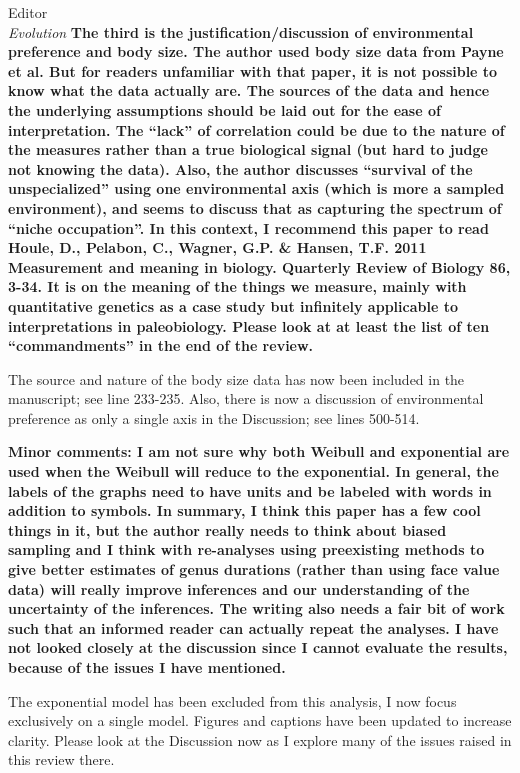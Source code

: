 \documentclass{letter}
\begin{document}
\begin{letter}{Editor \\ \textit{Evolution}}
  \textbf{The third is the justification/discussion of environmental preference and body size. The author used body size data from Payne et al. But for readers unfamiliar with that paper, it is not possible to know what the data actually are. The sources of the data and hence the underlying assumptions should be laid out for the ease of interpretation. The “lack” of correlation could be due to the nature of the measures rather than a true biological signal (but hard to judge not knowing the data). Also, the author discusses “survival of the unspecialized” using one environmental axis (which is more a sampled environment), and seems to discuss that as capturing the spectrum of “niche occupation”. In this context, I recommend this paper to read Houle, D., Pelabon, C., Wagner, G.P. \& Hansen, T.F. 2011 Measurement and meaning in biology. Quarterly Review of Biology 86, 3-34. It is on the meaning of the things we measure, mainly with quantitative genetics as a case study but infinitely applicable to interpretations in paleobiology. Please look at at least the list of ten “commandments” in the end of the review. }

  The source and nature of the body size data has now been included in the manuscript; see line 233-235. Also, there is now a discussion of environmental preference as only a single axis in the Discussion; see lines 500-514. %

  
  \textbf{Minor comments: I am not sure why both Weibull and exponential are used when the Weibull will reduce to the exponential. In general, the labels of the graphs need to have units and be labeled with words in addition to symbols. In summary, I think this paper has a few cool things in it, but the author really needs to think about biased sampling and I think with re-analyses using preexisting methods to give better estimates of genus durations (rather than using face value data) will really improve inferences and our understanding of the uncertainty of the inferences. The writing also needs a fair bit of work such that an informed reader can actually repeat the analyses. I have not looked closely at the discussion since I cannot evaluate the results, because of the issues I have mentioned. }
  
  The exponential model has been excluded from this analysis, I now focus exclusively on a single model. Figures and captions have been updated to increase clarity. Please look at the Discussion now as I explore many of the issues raised in this review there.



\end{letter}


\end{document}
